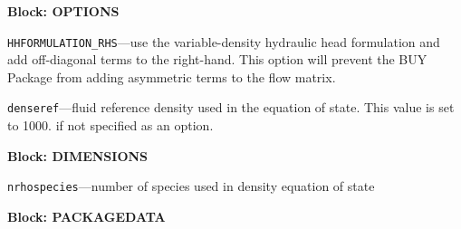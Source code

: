 
\item \textbf{Block: OPTIONS}

\begin{description}
\item \texttt{HHFORMULATION\_RHS}---use the variable-density hydraulic head formulation and add off-diagonal terms to the right-hand.  This option will prevent the BUY Package from adding asymmetric terms to the flow matrix.

\item \texttt{denseref}---fluid reference density used in the equation of state.  This value is set to 1000. if not specified as an option.

\end{description}
\item \textbf{Block: DIMENSIONS}

\begin{description}
\item \texttt{nrhospecies}---number of species used in density equation of state

\end{description}
\item \textbf{Block: PACKAGEDATA}


